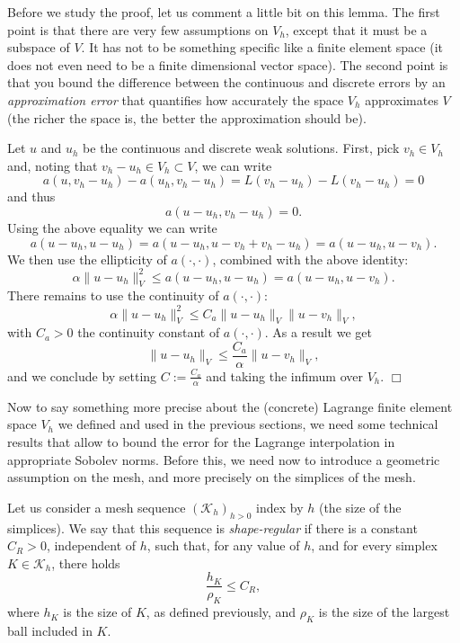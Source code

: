 \documentclass{article}
\begin{document}
Before we study the proof, let us comment a little bit on this lemma. The first point is that there are very few assumptions on $V_h$, except that it must be a subspace of $V$. It has not to be something specific like a finite element space (it does not even need to be a finite dimensional vector space).
The second point is that you bound the difference between the continuous and discrete errors by an \emph{approximation error} that quantifies how accurately the space $V_h$ approximates $V$ (the richer the space is, the better the approximation should be).

\medskip

 Let $u$ and $u_h$ be the continuous and discrete weak solutions. 
First, pick $v_h \in V_h$ and, noting that $v_h - u_h \in V_h \subset V$, we can write
\[
a ( u , v_h - u_h ) - a ( u_h , v_h - u_h ) 
=
L ( v_h - u_h ) - L ( v_h - u_h ) = 0
\]
and thus
\[
a ( u - u_h , v_h - u_h ) 
= 0.
\]
Using the above equality we can write
\[
a ( u - u_h , u - u_h )
= a ( u - u_h , u - v_h + v_h - u_h )
= a ( u - u_h , u - v_h ).
\]
We then use the ellipticity of $a(\cdot,\cdot)$, combined with the above identity:
\[
\alpha \| u - u_h \|^2_{V} \leq
a ( u - u_h , u - u_h )
= a ( u - u_h , u - v_h ).
\]
There remains to use the continuity of
$a(\cdot,\cdot)$:
\[
\alpha \| u - u_h \|^2_{V} \leq
C_a \| u - u_h \|_{V} \| u - v_h \|_{V},
\]
with $C_a > 0$ the continuity constant of $a(\cdot,\cdot)$. As a result we get 
\[
\| u - u_h \|_{V} \leq
\frac{C_a}{\alpha} \| u - v_h \|_{V},
\]
and we conclude by setting $C := \frac{C_a}{\alpha}$ and taking the infimum over $V_h$. $\Box$

\medskip

Now to say something more precise about the (concrete) Lagrange finite element space $V_h$ we defined and used in the previous sections, we need some technical results that allow to bound the error for the Lagrange interpolation in appropriate Sobolev norms. Before this, we need now to introduce a geometric assumption on the mesh, and more precisely on the simplices of the mesh.

\medskip

Let us consider a mesh sequence $(\mathcal{K}_h)_{h>0}$ index by $h$ (the size of the simplices). We say that this sequence is \emph{shape-regular} if there is a constant $C_R>0$, independent of $h$, such that, for any value of $h$, and for every simplex $K \in \mathcal{K}_h$, there holds
\[
\frac{h_K}{\rho_K} \leq C_R,
\]
where $h_K$ is the size of $K$, as defined previously, and $\rho_K$ is the size of the largest ball included in $K$.
\end{document}
